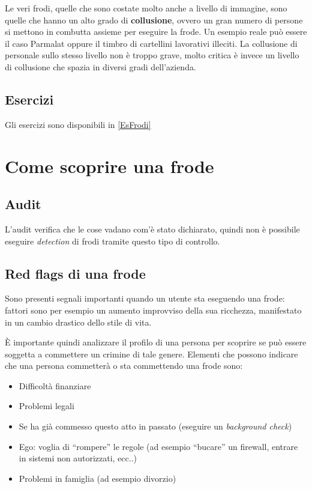 Le veri frodi, quelle che sono costate molto anche a livello di immagine, sono
quelle che hanno un alto grado di \textbf{collusione}, ovvero un gran numero di
persone si mettono in combutta assieme per eseguire la frode. Un esempio 
reale può essere il caso Parmalat oppure il timbro di cartellini lavorativi 
illeciti. La collusione di personale sullo stesso livello non è troppo grave, 
molto critica è invece un livello di collusione che spazia in diversi gradi 
dell'azienda.

\subsection{Esercizi}

Gli esercizi sono disponibili in \ref{EsFrodi}

\section{Come scoprire una frode}

\subsection{Audit}

L'audit verifica che le cose vadano com'è stato dichiarato, quindi non è
possibile eseguire \textit{detection} di frodi tramite questo tipo di controllo.

\subsection{Red flags di una frode}
Sono presenti segnali importanti quando un utente sta eseguendo una frode: 
fattori sono per esempio un aumento improvviso della sua ricchezza, manifestato
in un cambio drastico dello stile di vita.

È importante quindi analizzare il profilo di una persona per scoprire se può
essere soggetta a commettere un crimine di tale genere. Elementi che possono 
indicare che una persona commetterà o sta commettendo una frode sono:
\begin{itemize}
  \item Difficoltà finanziare
  \item Problemi legali
  \item Se ha già commesso questo atto in passato (eseguire un
  \textit{background check})
  \item Ego: voglia di ``rompere'' le regole (ad esempio ``bucare'' un
  firewall, entrare in sistemi non autorizzati, ecc..)
  \item Problemi in famiglia (ad esempio divorzio)
\end{itemize}

